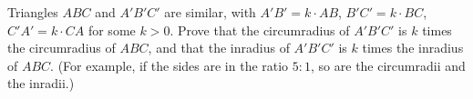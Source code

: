 Triangles $ABC$ and $A'B'C'$ are similar, with $A'B'=k\cdot AB$, $B'C'=k\cdot BC$, $C'A'=k\cdot CA$ for some $k>0$. Prove that the circumradius of $A'B'C'$ is $k$ times the circumradius of $ABC$, and that the inradius of $A'B'C'$ is $k$ times the inradius of $ABC$. (For example, if the sides are in the ratio $5:1$, so are the circumradii and the inradii.)
